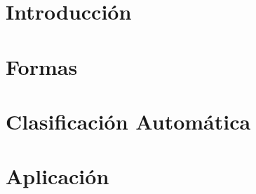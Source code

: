 \documentclass[a4paper,11pt]{book}
\begin{document}


\frontmatter


\tableofcontents
\listoftodos

\mainmatter

\chapter{Introducción}


\chapter{Formas}





\chapter{Clasificación Automática}





\chapter{Aplicación}




\end{document}
